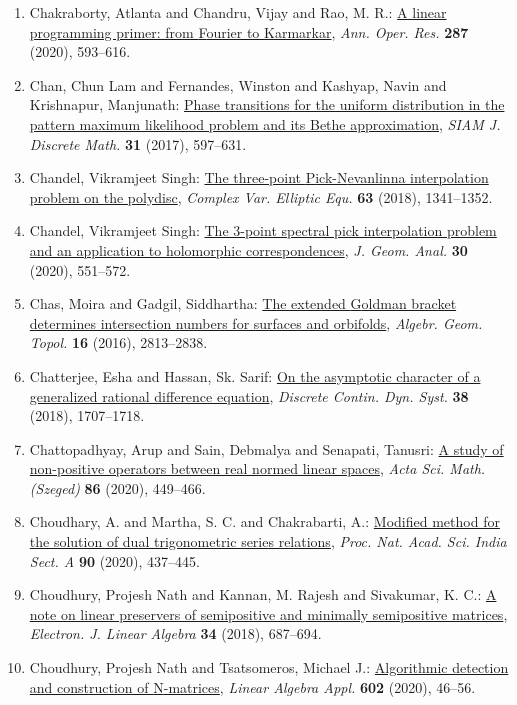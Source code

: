 \begin{enumerate}
\item Chakraborty, Atlanta and Chandru, Vijay and Rao, M. R.: \href{https://doi.org/10.1007/s10479-019-03186-2}{A linear programming primer: from {F}ourier to {K}armarkar}, \emph{Ann. Oper. Res.} {\bf 287} (2020), 593--616.
\item Chan, Chun Lam and Fernandes, Winston and Kashyap, Navin and
Krishnapur, Manjunath: \href{https://doi.org/10.1137/15M1028819}{Phase transitions for the uniform distribution in the pattern
maximum likelihood problem and its {B}ethe approximation}, \emph{SIAM J. Discrete Math.} {\bf 31} (2017), 597--631.
\item Chandel, Vikramjeet Singh: \href{https://doi.org/10.1080/17476933.2017.1370461}{The three-point {P}ick-{N}evanlinna interpolation problem on
the polydisc}, \emph{Complex Var. Elliptic Equ.} {\bf 63} (2018), 1341--1352.
\item Chandel, Vikramjeet Singh: \href{https://doi.org/10.1007/s12220-018-00123-w}{The 3-point spectral pick interpolation problem and an
application to holomorphic correspondences}, \emph{J. Geom. Anal.} {\bf 30} (2020), 551--572.
\item Chas, Moira and Gadgil, Siddhartha: \href{https://doi.org/10.2140/agt.2016.16.2813}{The extended {G}oldman bracket determines intersection numbers
for surfaces and orbifolds}, \emph{Algebr. Geom. Topol.} {\bf 16} (2016), 2813--2838.
\item Chatterjee, Esha and Hassan, Sk. Sarif: \href{https://doi.org/10.3934/dcds.2018070}{On the asymptotic character of a generalized rational
difference equation}, \emph{Discrete Contin. Dyn. Syst.} {\bf 38} (2018), 1707--1718.
\item Chattopadhyay, Arup and Sain, Debmalya and Senapati, Tanusri: \href{https://doi.org/10.14232/actasm-019-554-z}{A study of non-positive operators between real normed linear
spaces}, \emph{Acta Sci. Math. (Szeged)} {\bf 86} (2020), 449--466.
\item Choudhary, A. and Martha, S. C. and Chakrabarti, A.: \href{https://doi.org/10.1007/s40010-019-00600-z}{Modified method for the solution of dual trigonometric series
relations}, \emph{Proc. Nat. Acad. Sci. India Sect. A} {\bf 90} (2020), 437--445.
\item Choudhury, Projesh Nath and Kannan, M. Rajesh and Sivakumar,
K. C.: \href{https://doi.org/10.13001/1081-3810.3864}{A note on linear preservers of semipositive and minimally
semipositive matrices}, \emph{Electron. J. Linear Algebra} {\bf 34} (2018), 687--694.
\item Choudhury, Projesh Nath and Tsatsomeros, Michael J.: \href{https://doi.org/10.1016/j.laa.2020.04.028}{Algorithmic detection and construction of {N}-matrices}, \emph{Linear Algebra Appl.} {\bf 602} (2020), 46--56.

\end{enumerate}
